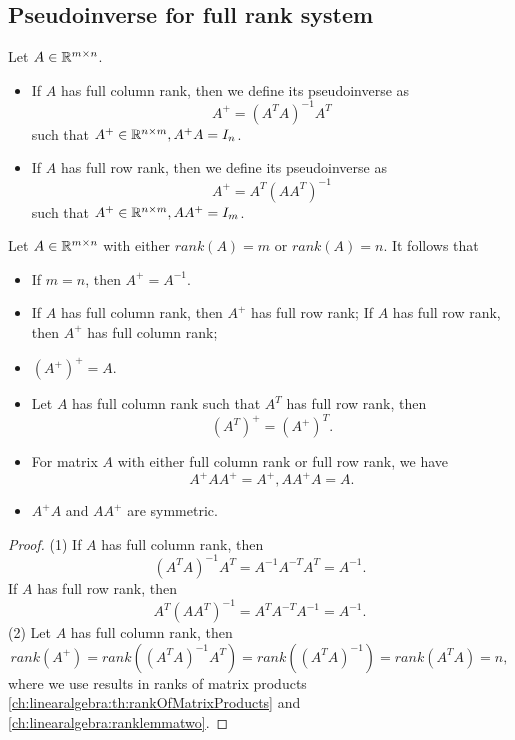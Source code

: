 \begin{refsection}
\subsection{Pseudoinverse for full rank system}
\begin{definition}\label{ch:linearalgebra:def:psedudoinverseOfFullRankSystem}
Let $A\in \mathbb{R}^{m\times n}$. 
\begin{itemize}
	\item If $A$ has full column rank, then we define its pseudoinverse as
	$$A^+ = (A^TA)^{-1}A^T$$
	such that $A^+\in \mathbb{R}^{n\times m}, A^+A = I_n$.
	\item If $A$ has full row rank, then we define its pseudoinverse as
	$$A^+ = A^T(AA^T)^{-1}$$
	such that $A^+\in \mathbb{R}^{n\times m}, AA^+ = I_m$.
\end{itemize}	
\end{definition}

\begin{lemma}\label{ch:linearalgebra:th:BasicPropertyPseudoInverse}
Let $A\in \mathbb{R}^{m\times n}$ with either $rank(A) = m$ or $rank(A) = n$. It follows that
\begin{itemize}
	\item If $m=n$, then $A^+ = A^{-1}$.
	\item If $A$ has full column rank, then $A^+$ has full row rank; If $A$ has full row rank, then $A^+$ has full column rank;
	\item $(A^+)^+ = A.$
	\item Let $A$ has full column rank such that $A^T$ has full row rank, then
	$$(A^T)^+ = (A^+)^T.$$
	\item For matrix $A$ with either full column rank or full row rank, we have
	$$A^+AA^+ = A^+, AA^+A = A.$$
	\item 	$A^+A$ and $AA^+$ are symmetric.
	 
\end{itemize}	
\end{lemma}
\begin{proof}
(1) If $A$ has full column rank, then
$$(A^TA)^{-1}A^T = A^{-1}A^{-T}A^T = A^{-1}.$$
 If $A$ has full row rank, then
 $$A^T(AA^T)^{-1} = A^{T}A^{-T}A^{-1} = A^{-1}.$$
(2)	Let $A$ has full column rank, then $$rank(A^+) = rank((A^TA)^{-1}A^T) = rank((A^TA)^{-1})=rank(A^TA) = n, $$
where we use results in ranks of matrix products 
\autoref{ch:linearalgebra:th:rankOfMatrixProducts} and \autoref{ch:linearalgebra:ranklemmatwo}.


\end{proof}
\end{refsection}
